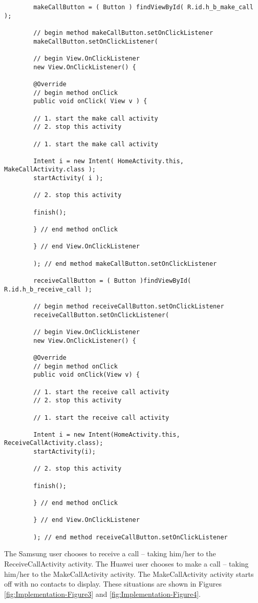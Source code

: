 \documentclass[12pt,svgnames,smaller]{article} %
\begin{document}
		\begin{verbatim}
		makeCallButton = ( Button ) findViewById( R.id.h_b_make_call );
		
		// begin method makeCallButton.setOnClickListener
		makeCallButton.setOnClickListener(
		
		// begin View.OnClickListener
		new View.OnClickListener() {
		
		@Override
		// begin method onClick
		public void onClick( View v ) {
		
		// 1. start the make call activity
		// 2. stop this activity
		
		// 1. start the make call activity
		
		Intent i = new Intent( HomeActivity.this, MakeCallActivity.class );
		startActivity( i );
		
		// 2. stop this activity
		
		finish();
		
		} // end method onClick
		
		} // end View.OnClickListener
		
		); // end method makeCallButton.setOnClickListener
		
		receiveCallButton = ( Button )findViewById( R.id.h_b_receive_call );
		
		// begin method receiveCallButton.setOnClickListener
		receiveCallButton.setOnClickListener(
		
		// begin View.OnClickListener
		new View.OnClickListener() {
		
		@Override
		// begin method onClick
		public void onClick(View v) {
		
		// 1. start the receive call activity
		// 2. stop this activity
		
		// 1. start the receive call activity
		
		Intent i = new Intent(HomeActivity.this, ReceiveCallActivity.class);
		startActivity(i);
		
		// 2. stop this activity
		
		finish();
		
		} // end method onClick
		
		} // end View.OnClickListener
		
		); // end method receiveCallButton.setOnClickListener		        
		\end{verbatim}
		
		The Samsung user chooses to receive a call – taking him/her to the ReceiveCallActivity activity. The Huawei user chooses to make a call – taking him/her to the MakeCallActivity activity. The MakeCallActivity activity starts off with no contacts to display. These situations are shown in Figures \ref{fig:Implementation-Figure3} and \ref{fig:Implementation-Figure4}.
		
\end{document}
